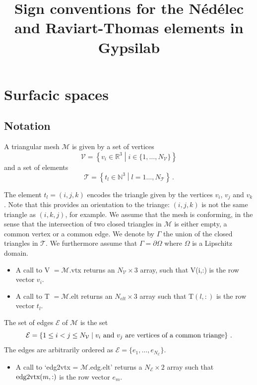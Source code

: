 \documentclass[]{article}
\title{Sign conventions for the Nédélec and Raviart-Thomas elements in Gypsilab}
\author{}
\theoremstyle{definition}
\theoremstyle{remark}
\newcommand{\enstq}[2]{\left\{#1\mathrel{}\middle|\mathrel{}#2\right\}}
\newcommand{\N}{\mathbb{N}}
\newcommand{\R}{\mathbb{R}}
\begin{document}
\maketitle


\section{Surfacic spaces}

\subsection*{Notation}


A triangular mesh $\mathcal{M}$ is given by a set of vertices 
$$\mathcal{V} = \enstq{v_i \in \R^3}{i \in \{1,\ldots,N_\mathcal{V}\}}$$ 
and a set of elements 
$$\mathcal{T} = \enstq{t_l \in \N^3}{l = 1\ldots,N_{\mathcal{T}}}\,.$$

The element $t_l = (i,j,k)$ encodes the triangle given by the vertices $v_i$, $v_j$ and $v_k$. Note that this provides an orientation to the triange: $(i,j,k)$ is not the same triangle as $(i,k,j)$, for example. We assume that the mesh is conforming, in the sense that the intersection of two closed triangles in $\mathcal{M}$ is either empty, a common vertex or a common edge. 
We denote by $\Gamma$ the union of the closed triangles in $\mathcal{T}$. We furthermore assume that $\Gamma = \partial \Omega$ where $\Omega$ is a Lipschitz domain. 


\begin{itemize}
	\item A call to V $= \mathcal{M}$.vtx returns an $N_{\mathcal{V}} \times 3$ array, such that V(i,:) is the row vector $v_i$. 
	\item A call to T $= \mathcal{M}$.elt returns an $N_{elt} \times 3$ array such that T$(l,:)$ is the row vector $t_l$. 
\end{itemize}


The set of edges $\mathcal{E}$ of $\mathcal{M}$ is the set 
\[\mathcal{E} = \enstq{1 \leq i < j \leq N_{\mathcal{V}}}{v_i \textup{ and } v_j \textup{ are vertices of a common triange}}\,.\]
The edges are arbitrarily ordered as $\mathcal{E} = \{e_1, \ldots, e_{N_\mathcal{E}}\}$. 
\begin{itemize}
	\item A call to `edg2vtx = $\mathcal{M}$.edg.elt' returns a $N_{\mathcal{E}} \times 2$ array such that ${\textup{edg2vtx}(m,:)}$ is the row vector $e_m$. 
\end{itemize}
\end{document}
